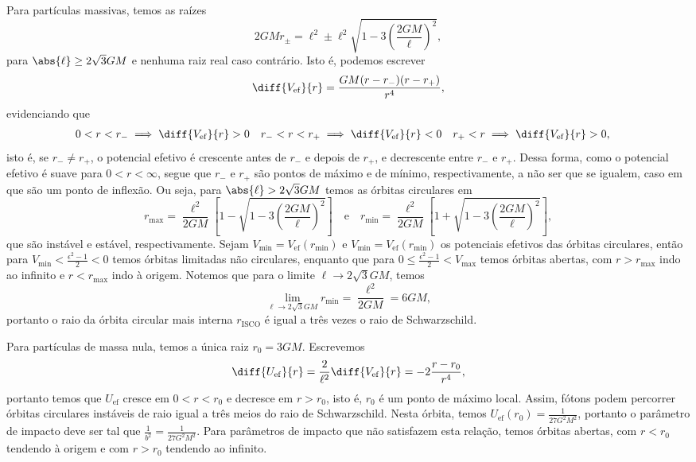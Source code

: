Para partículas massivas, temos as raízes
\begin{equation*}
    2GM r_{\pm} = \ell^2 \pm \ell^2\sqrt{1 - 3 \left(\frac{2GM}{\ell}\right)^2},
\end{equation*}
para \(\abs{\ell} \geq 2\sqrt{3} GM\) e nenhuma raiz real caso contrário. Isto é, podemos escrever
\begin{equation*}
    \diff{V_\mathrm{ef}}{r} = \frac{GM (r - r_-)(r-r_+)}{r^4},
\end{equation*}
evidenciando que
\begin{align*}
    0 < r < r_- &\implies \diff{V_\mathrm{ef}}{r} > 0& r_- < r < r_+ &\implies \diff{V_\mathrm{ef}}{r} < 0 & r_+ < r &\implies \diff{V_\mathrm{ef}}{r} > 0,
\end{align*}
isto é, se \(r_- \neq r_+\), o potencial efetivo é crescente antes de \(r_-\) e depois de \(r_+\), e decrescente entre \(r_-\) e \(r_+\). Dessa forma, como o potencial efetivo é suave para \(0 < r < \infty\), segue que \(r_-\) e \(r_+\) são pontos de máximo e de mínimo, respectivamente, a não ser que se igualem, caso em que são um ponto de inflexão. Ou seja, para \(\abs{\ell} > 2\sqrt{3}GM\) temos as órbitas circulares em
\begin{equation*}
    r_\mathrm{max} = \frac{\ell^2}{2GM}\left[1 - \sqrt{1 - 3\left(\frac{2GM}{\ell}\right)^2}\right]\quad\text{e}\quad
    r_\mathrm{min} = \frac{\ell^2}{2GM}\left[1 + \sqrt{1 - 3\left(\frac{2GM}{\ell}\right)^2}\right],
\end{equation*}
que são instável e estável, respectivamente. Sejam \(V_\mathrm{min} = V_\mathrm{ef}(r_\mathrm{min})\) e \(V_\mathrm{min} = V_\mathrm{ef}(r_\mathrm{min})\) os potenciais efetivos das órbitas circulares, então para \(V_\mathrm{min} < \frac{\epsilon^2 - 1}{2} < 0\) temos órbitas limitadas não circulares, enquanto que para \(0 \leq \frac{\epsilon^2 - 1}{2} < V_\mathrm{max}\) temos órbitas abertas, com \(r > r_\mathrm{max}\) indo ao infinito e \(r < r_\mathrm{max}\) indo à origem. Notemos que para o limite \(\ell \to 2\sqrt{3}GM\), temos
\begin{equation*}
    \lim_{\ell \to 2\sqrt{3}GM} r_\mathrm{min} = \frac{\ell^2}{2GM} = 6GM,
\end{equation*}
portanto o raio da órbita circular mais interna \(r_\mathrm{ISCO}\) é igual a três vezes o raio de Schwarzschild.

Para partículas de massa nula, temos a única raiz \(r_0 = 3GM\). Escrevemos
\begin{equation*}
    \diff{U_\mathrm{ef}}{r} = \frac{2}{\ell^2}\diff{V_\mathrm{ef}}{r} = -2\frac{r - r_0}{r^4},
\end{equation*}
portanto temos que \(U_\mathrm{ef}\) cresce em \(0 < r < r_0\) e decresce em \(r > r_0\), isto é, \(r_0\) é um ponto de máximo local. Assim, fótons podem percorrer órbitas circulares instáveis de raio igual a três meios do raio de Schwarzschild. Nesta órbita, temos \(U_\mathrm{ef}(r_0) = \frac{1}{27 G^2M^2}\), portanto o parâmetro de impacto deve ser tal que \(\frac1{b^2} = \frac{1}{27G^2M^2}\). Para parâmetros de impacto que não satisfazem esta relação, temos órbitas abertas, com \(r < r_0\) tendendo à origem e com \(r > r_0\) tendendo ao infinito.

